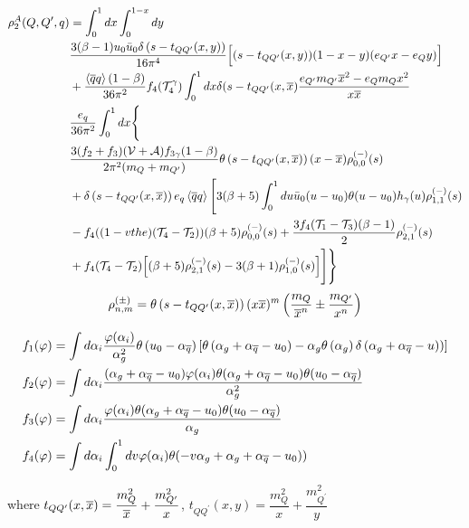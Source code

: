 %
\begin{align}
        \nonumber\rho^A_2(Q,Q^\prime,q) &= \int_0^1 dx \int_0^{1-x} dy \\
        \nonumber&\dfrac{3(\beta-1) u_0\bar{u}_0\delta\left(s-t_{QQ^\prime}(x,y)\right)}{16\pi^4}\Big[(s-t_{QQ^\prime}(x,y)) (1-x-y)(e_{Q^\prime} x - e_Q y) \Big]  \\
        \nonumber&+\dfrac{\left\langle\overline{q}q\right\rangle(1-\beta)}{36\pi^2}f_4(\mathcal{T}_4^\gamma)\int_0^1dx\delta(s-t_{QQ^\prime}(x,\overline{x})\dfrac{e_{Q^\prime}m_{Q^\prime}\overline{x}^2-e_Qm_Qx^2}{x\overline{x}}\\
        \nonumber&\dfrac{e_q}{36\pi^2} \int_0^1 dx\Bigg\{  \\
        &\dfrac{3(f_2+f_3)(\mathcal{V}+\mathcal{A}) f_{3\gamma} (1-\beta) }{2\pi^2(m_Q+m_{Q^\prime})}\theta\left(s-t_{QQ^\prime}(x,\overline{x})\right) (x-\overline{x})\rho^{(-)}_{0,0}(s)\\
        \nonumber&+\delta\left(s-t_{QQ^\prime}(x,\overline{x})\right)e_q\left\langle\overline{q}q\right\rangle\Bigg[3(\beta+5)\int_0^1 du \bar{u}_0(u-u_0)\theta(u-u_0)h_\gamma(u) \rho^{(-)}_{1,1}(s)  \\
        \nonumber&-f_4((1-vthe)(\mathcal{T}_4-\mathcal{T}_2))  (\beta+5) \rho^{(-)}_{0,0}(s)+\dfrac{3f_4(\mathcal{T}_1-\mathcal{T}_3) (\beta-1)}{2} \rho^{(-)}_{2,1}(s)  \\
        \nonumber&+f_4(\mathcal{T}_4-\mathcal{T}_2) \Big[ (\beta+5)\rho^{(-)}_{2,1}(s) - 3(\beta+1)\rho^{(-)}_{1,0}(s) \Big]\Bigg]\Bigg\} 
    \end{align}
%
\begin{equation}
    \rho^{(\pm)}_{n,m} =  \theta\left(s-t_{QQ^\prime}(x,\overline{x})\right) (x\overline{x})^m \left(\dfrac{m_Q}{\overline{x}^n}\pm\dfrac{m_{Q^\prime}}{x^n}\right) 
\end{equation}

\begin{equation}
    \begin{aligned}
        f_1(\varphi) &= \int d\alpha_i\frac{\varphi(\alpha_i)}{\alpha_g^2}\theta\left(u_0-\alpha_{\overline{q}}\right)\left[\theta\left(\alpha_g+\alpha_{\overline{q}}-u_0\right)-\alpha_g\theta\left(\alpha_g\right)\delta\left(\alpha_g+\alpha_{\overline{q}}-u)\right) \right] \\
        f_2(\varphi) &= \int d\alpha_i\frac{(\alpha_g+\alpha_{\overline{q}}-u_0) \varphi(\alpha_i)\theta(\alpha_g+\alpha_{\overline{q}}-u_0)\theta(u_0-\alpha_{\overline{q}})}{\alpha_g^2} \\
        f_3(\varphi) &=\int d\alpha_i\frac{\varphi(\alpha_i)\theta(\alpha_g+\alpha_{\overline{q}}-u_0)\theta(u_0-\alpha_{\overline{q}})}{\alpha_g} \\
        f_4(\varphi) &= \int d\alpha_i\int_0^1 dv \varphi(\alpha_i) \theta(-v\alpha_g+\alpha_g+\alpha_{\overline{q}}-u_0)) \\
    \end{aligned}
\end{equation}

where $t_{QQ^\prime}(x,\overline{x}) = \dfrac{m_Q^2}{\overline{x}}+\dfrac{m_{Q^\prime}^2}{x}$,  $t_{QQ^\prime}(x,y) = \dfrac{m_Q^2}{x}+\dfrac{m_{Q^\prime}^2}{y}$